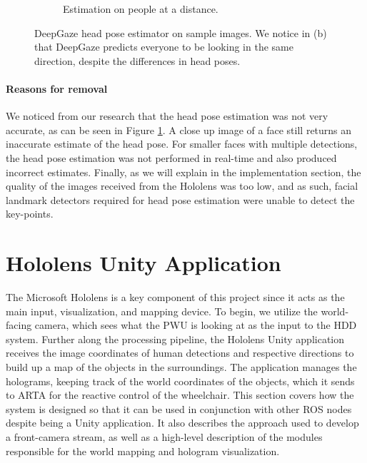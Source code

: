 \begin{figure}[ht]
\begin{subfigure}[b]{.5\textwidth}
        \caption{Estimation on people at a distance.}
    \end{subfigure}
    \vspace{-2\baselineskip}
    \begin{center}
        \caption{DeepGaze head pose estimator on sample images. We notice in (b) that DeepGaze predicts everyone to be looking in the same direction, despite the differences in head poses.}
        \label{fig:deepGaze}
    \end{center}
    \vspace{-2\baselineskip}
\end{figure}

\paragraph{Reasons for removal} We noticed from our research that the head pose estimation was not very accurate, as can be seen in Figure \ref{fig:deepGaze}. A close up image of a face still returns an inaccurate estimate of the head pose. For smaller faces with multiple detections, the head pose estimation was not performed in real-time and also produced incorrect estimates. Finally, as we will explain in the implementation section, the quality of the images received from the Hololens was too low, and as such, facial landmark detectors required for head pose estimation were unable to detect the key-points.

\section{Hololens Unity Application}
The Microsoft Hololens is a key component of this project since it acts as the main input, visualization, and mapping device. To begin, we utilize the world-facing camera, which sees what the PWU is looking at as the input to the HDD system. Further along the processing pipeline, the Hololens Unity application receives the image coordinates of human detections and respective directions to build up a map of the objects in the surroundings. The application manages the holograms, keeping track of the world coordinates of the objects, which it sends to ARTA for the reactive control of the wheelchair.
This section covers how the system is designed so that it can be used in conjunction with other ROS nodes despite being a Unity application. It also describes the approach used to develop a front-camera stream, as well as a high-level description of the modules responsible for the world mapping and hologram visualization.

